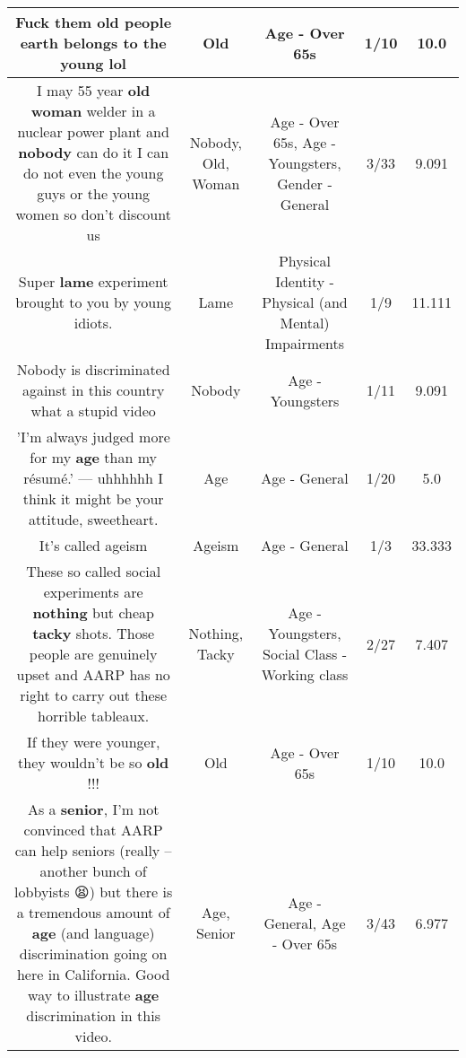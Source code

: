 \documentclass[11pt]{article}
\newlength\mylength
\begin{document}
\begin{center}
\begin{longtable}{|C{.65\mylength}|C{.30\mylength}|C{.12\mylength}|C{.12\mylength}|C{.12\mylength}|}
  \small Fuck them \textbf{old} people earth belongs to the young lol\normalsize   & Old & Age - Over 65s & 1/10 & 10.0 \\  \hline
  \small I may 55 year \textbf{old} \textbf{woman} welder in a nuclear power plant and \textbf{nobody} can do it I can do not even the young guys or the young women so don't discount us\normalsize   & Nobody, Old, Woman & Age - Over 65s, Age - Youngsters, Gender - General & 3/33 & 9.091 \\  \hline
  \small Super \textbf{lame} experiment brought to you by young idiots.\normalsize   & Lame & Physical Identity - Physical (and Mental) Impairments & 1/9 & 11.111 \\  \hline
  \small Nobody is discriminated against in this country what a stupid video\normalsize   & Nobody & Age - Youngsters & 1/11 & 9.091 \\  \hline
  \small 'I'm always judged more for my \textbf{age} than my résumé.' — uhhhhhh I think it might be your attitude, sweetheart.\normalsize   & Age & Age - General & 1/20 & 5.0 \\  \hline
  \small It's called ageism\normalsize   & Ageism & Age - General & 1/3 & 33.333 \\  \hline
  \small These so called social experiments are \textbf{nothing} but cheap \textbf{tacky} shots. Those people are genuinely upset and AARP has no right to carry out these horrible tableaux.\normalsize   & Nothing, Tacky & Age - Youngsters, Social Class - Working class & 2/27 & 7.407 \\  \hline
  \small If they were younger, they wouldn't be so \textbf{old} !!!\normalsize   & Old & Age - Over 65s & 1/10 & 10.0 \\  \hline
  \small As a \textbf{senior}, I'm not convinced that AARP can help seniors (really -- another bunch of lobbyists 😫) but there is a tremendous amount of \textbf{age} (and language) discrimination going on here in California. Good way to illustrate \textbf{age} discrimination in this video.\normalsize   & Age, Senior & Age - General, Age - Over 65s & 3/43 & 6.977 \\  \hline

\end{longtable}
\end{center}
\end{document}

